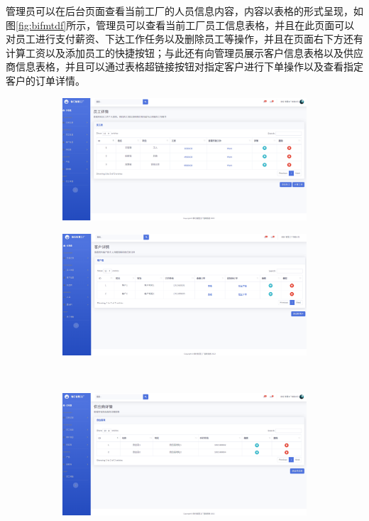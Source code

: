 管理员可以在后台页面查看当前工厂的人员信息内容，内容以表格的形式呈现，如图\ref{fig:bifmtdf}所示，管理员可以查看当前工厂员工信息表格，并且在此页面可以对员工进行支付薪资、下达工作任务以及删除员工等操作，并且在页面右下方还有计算工资以及添加员工的快捷按钮；与此还有向管理员展示客户信息表格以及供应商信息表格，并且可以通过表格超链接按钮对指定客户进行下单操作以及查看指定客户的订单详情。

\begin{figure}[H]
    \centering
    \begin{subfigure}{.45\textwidth}
        \centering
        \includegraphics[width=\textwidth]{figures/5employeedetail.png}
    \end{subfigure}
    \qquad
    \begin{subfigure}{.45\textwidth}
        \centering
        \includegraphics[width=\textwidth]{figures/5customerdetail.png}
    \end{subfigure}
    \\
    \begin{subfigure}{.45\textwidth}
        \centering
        \includegraphics[width=\textwidth]{figures/5supplierdetail.png}

\end{subfigure}
\end{figure}
